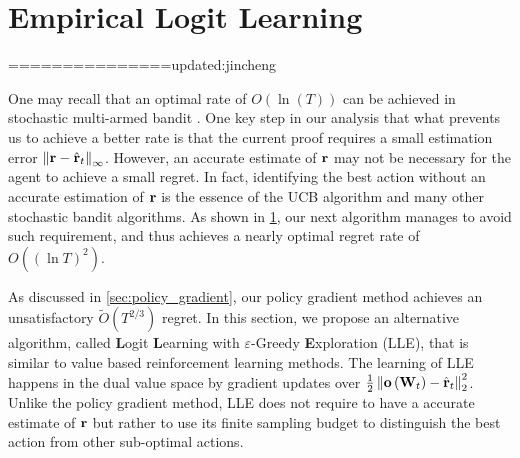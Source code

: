 \section{Empirical Logit Learning}
\label{sec:logit_learning}

===============updated:jincheng

One may recall that an optimal rate of $O(\ln(T))$ can be achieved in stochastic multi-armed bandit \citep{bubeck2012regret}. 
One key step in our analysis that what prevents us to achieve a better rate is that the current proof requires a small estimation error $\left\| {\mathbf{r}} - \hat{{\mathbf{r}}}_t \right\|_\infty$.
However, an accurate estimate of ${\mathbf{r}}$ may not be necessary for the agent to achieve a small regret. 
In fact, identifying the best action without an accurate estimation of ${\mathbf{r}}$ is the essence of the UCB algorithm and many other stochastic bandit algorithms. 
As shown in \cref{sec:logit_learning}, our next algorithm manages to avoid such requirement, and thus achieves a nearly optimal regret rate of $O((\ln T)^2)$.

As discussed in \cref{sec:policy_gradient}, our policy gradient method achieves an unsatisfactory $\tilde{O}(T^{2/3})$ regret.
In this section, we propose an alternative algorithm, called {\bf L}ogit {\bf L}earning with $\varepsilon$-Greedy {\bf E}xploration (LLE), that is similar to value based reinforcement learning methods.
The learning of LLE happens in the dual value space by gradient updates over $\frac{1}{2} \left\| {\mathbf{o}}\left( {\mathbf{W}}_t\right) - \hat{{\mathbf{r}}}_t \right\|_2^2$.
Unlike the policy gradient method, LLE does not require to have a accurate estimate of ${\mathbf{r}}$ but rather to use its finite sampling budget to distinguish the best action from other sub-optimal actions.

